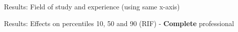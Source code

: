 \documentclass[11pt, aspectratio=169]{beamer}
\begin{document}
\begin{frame}{Results: Field of study and experience (using same x-axis)}
    \centering
\end{frame}


\begin{frame}{Results: Effects on percentiles 10, 50 and 90 (RIF) - \textbf{Complete} professional}
    \centering
\end{frame}
\end{document}
